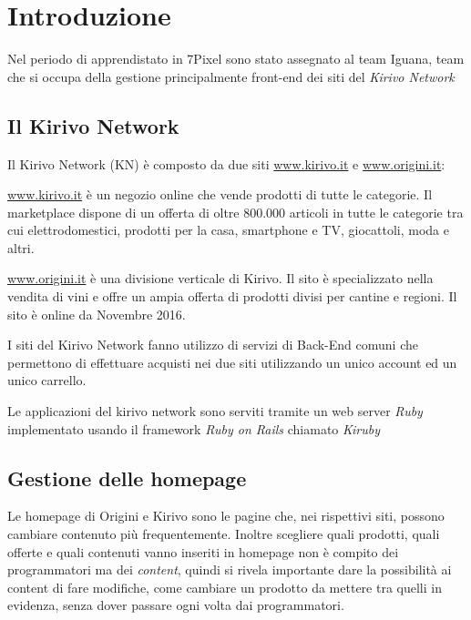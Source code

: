 


\section{Introduzione}
Nel periodo di apprendistato in 7Pixel sono stato assegnato al team Iguana, team che si occupa
della gestione principalmente front-end dei siti del \emph{Kirivo Network}

\subsection{Il Kirivo Network}
Il Kirivo Network (KN) è composto da due siti  \url{www.kirivo.it} 
e \url{www.origini.it}:

\url{www.kirivo.it} è un negozio online che vende prodotti di tutte le categorie.
Il marketplace dispone di un offerta di oltre 800.000 articoli in tutte le categorie tra cui
elettrodomestici, prodotti per la casa, smartphone e TV, giocattoli, moda e altri.

\url{www.origini.it} è una divisione verticale di Kirivo. Il sito è specializzato nella vendita
di vini e offre un ampia offerta di prodotti divisi per cantine e regioni. Il sito
è online da Novembre 2016.

I siti del Kirivo Network fanno utilizzo di servizi di Back-End comuni che permettono 
di effettuare acquisti nei due siti utilizzando un unico account ed un unico carrello.

Le applicazioni del kirivo network sono serviti tramite un web server \emph{Ruby} implementato
usando il framework \emph{Ruby on Rails} chiamato \emph{Kiruby}

\subsection{Gestione delle homepage}

Le homepage di Origini e Kirivo sono le pagine che, nei rispettivi siti, possono cambiare contenuto più 
frequentemente. Inoltre scegliere quali prodotti, quali offerte e quali contenuti 
vanno inseriti in homepage non è compito dei programmatori ma dei \emph{content},
quindi si rivela importante dare la possibilità ai content di fare modifiche, come cambiare un prodotto da
mettere tra quelli in evidenza, senza dover passare ogni volta dai programmatori.


